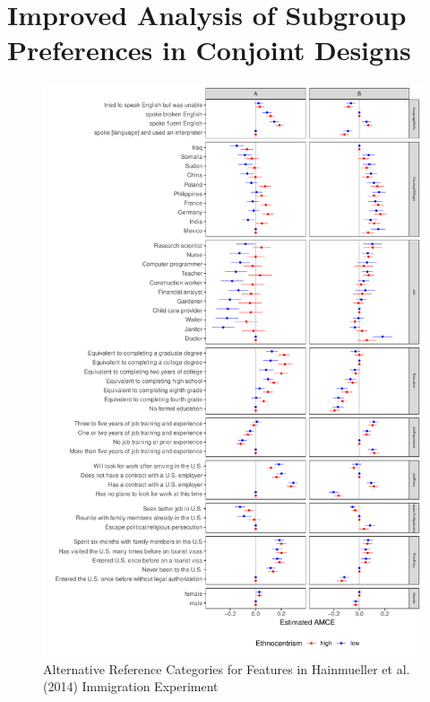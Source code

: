 \documentclass[a4paper,12pt]{article}\usepackage[]{graphicx}\usepackage[]{color}
\makeatletter
\def\maxwidth{ %
  \ifdim\Gin@nat@width>\linewidth
    \linewidth
  \else
    \Gin@nat@width
  \fi
}
\newenvironment{knitrout}{}{} %
\makeatother
\begin{document}
\section*{Improved Analysis of Subgroup Preferences in Conjoint Designs}\label{sec:marginalmeans}



\begin{knitrout}
\color{fgcolor}\begin{figure}
\includegraphics[width=\maxwidth]{figure/hainmueller_subgroup_example_plot-1} \caption[Alternative Reference Categories for Features in Hainmueller et al]{Alternative Reference Categories for Features in Hainmueller et al. (2014) Immigration Experiment}\label{fig:hainmueller_subgroup_example_plot}
\end{figure}


\end{knitrout}
\end{document}
